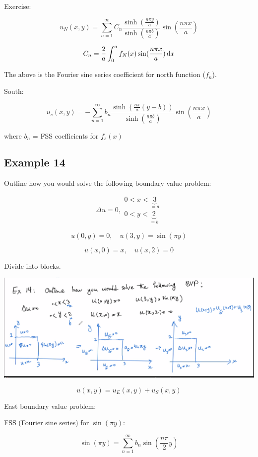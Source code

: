\documentclass{article}
\begin{document}
Exercise:

$$u_N (x,y) = \sum_{n=1}^\infty C_n \frac{ \sinh( \frac{n \pi y}{a})}{\sinh( \frac{n \pi b}{a})} \sin ( \frac{n \pi x}{a})$$

$$C_n = \frac{2}{a} \int_0^a f_N (x) \sin( \frac{n \pi x}{a}) \,\mathrm{d} x$$

The above is the Fourier sine series coefficient for north function ($f_n$). 

South:

$$u_s (x,y) = - \sum_{n=1}^\infty b_n \frac{\sinh( \frac{n \pi}{a} (y-b))}{\sinh ( \frac{n \pi b}{a})} \sin( \frac{n \pi x}{a})$$

where $b_n$ = FSS coefficients for $f_s(x)$

\subsection{Example 14}

Outline how you would solve the following boundary value problem:

$$\Delta u = 0, \begin{matrix} 0 < x < \underbrace{3}_{=a} \\ 0 < y < \underbrace{2}_{=b} \end{matrix}$$

$$u(0,y) = 0, \quad u(3,y) = \sin(\pi y)$$

$$u(x,0) = x, \quad u(x,2) = 0$$

Divide into blocks. 

\begin{center}
    \includegraphics[width = 0.9 \textwidth]{image7.png}
\end{center}

$$u(x,y) = u_E (x,y) + u_S (x,y)$$

East boundary value problem:

FSS (Fourier sine series) for $\sin(\pi y)$:

$$\sin( \pi y) = \sum_{n=1}^\infty b_n \sin( \frac{n \pi}{2} y)$$
\end{document}
